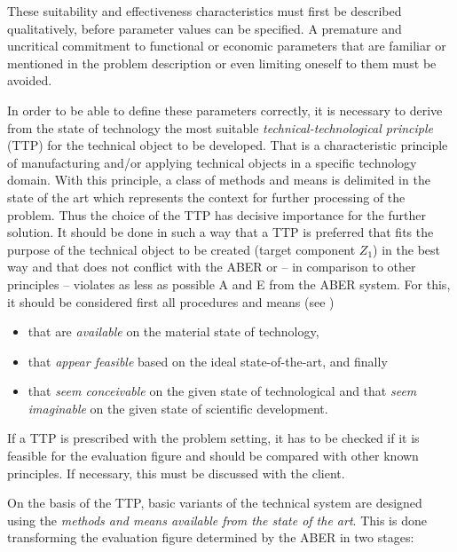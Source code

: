 \documentclass[11pt,a4paper]{article}
\begin{document}
These suitability and effectiveness characteristics must first be described
qualitatively, before parameter values can be specified. A premature and
uncritical commitment to functional or economic parameters that are familiar
or mentioned in the problem description or even limiting oneself to them must
be avoided.

In order to be able to define these parameters correctly, it is necessary to
derive from the state of technology the most suitable
\emph{technical-technological principle} (TTP) for the technical object to be
developed. That is a characteristic principle of manufacturing and/or applying
technical objects in a specific technology domain. With this principle, a
class of methods and means is delimited in the state of the art which
represents the context for further processing of the problem. Thus the choice
of the TTP has decisive importance for the further solution. It should be done
in such a way that a TTP is preferred that fits the purpose of the technical
object to be created (target component $Z_1$) in the best way and that does
not conflict with the ABER or -- in comparison to other principles -- violates
as less as possible A and E from the ABER system. For this, it should be
considered first all procedures and means (see \cite[Appendix 1]{ProHEAL-21})
\begin{itemize}
\item that are \emph{available} on the material state of technology,
\item that \emph{appear feasible} based on the ideal state-of-the-art, and
  finally
\item that \emph{seem conceivable} on the given state of technological and
  that \emph{seem imaginable} on the given state of scientific development.
\end{itemize}
If a TTP is prescribed with the problem setting, it has to be checked if it is
feasible for the evaluation figure and should be compared with other known
principles. If necessary, this must be discussed with the client.

On the basis of the TTP, basic variants of the technical system are designed
using the \emph{methods and means available from the state of the art}.  This
is done transforming the evaluation figure determined by the ABER in two
stages:
\end{document}
